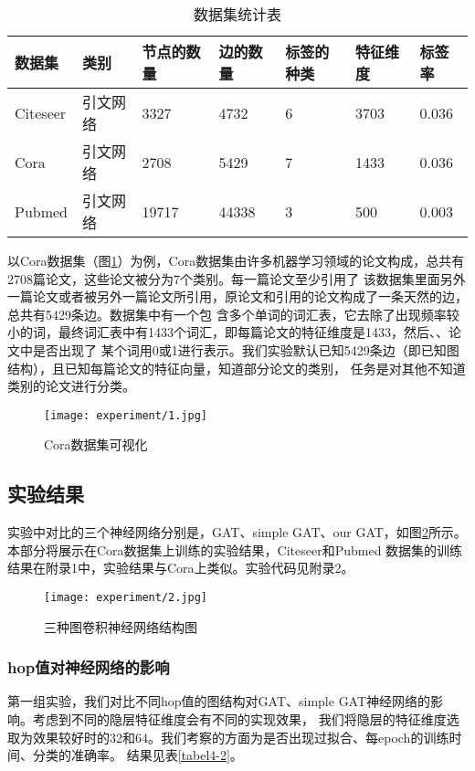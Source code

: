 \begin{table}[]
    \centering
    \caption{数据集统计表}
    \label{tabel4-1}
    \begin{tabular}{lllllll}
    数据集      & 类别   & 节点的数量 & 边的数量  & 标签的种类 & 特征维度 & 标签率   \\ \hline
    Citeseer & 引文网络 & 3327  & 4732  & 6     & 3703 & 0.036 \\
    Cora     & 引文网络 & 2708  & 5429  & 7     & 1433 & 0.036 \\
    Pubmed   & 引文网络 & 19717 & 44338 & 3     & 500  & 0.003
    \end{tabular}
\end{table}

以Cora数据集（图\ref{4-1}）为例，Cora数据集由许多机器学习领域的论文构成，总共有2708篇论文，这些论文被分为7个类别。每一篇论文至少引用了
该数据集里面另外一篇论文或者被另外一篇论文所引用，原论文和引用的论文构成了一条天然的边，总共有5429条边。数据集中有一个包
含多个单词的词汇表，它去除了出现频率较小的词，最终词汇表中有1433个词汇，即每篇论文的特征维度是1433，然后、、论文中是否出现了
某个词用0或1进行表示。我们实验默认已知5429条边（即已知图结构），且已知每篇论文的特征向量，知道部分论文的类别，
任务是对其他不知道类别的论文进行分类。

\begin{figure}[ht]
    \centering
    \texttt{[image: experiment/1.jpg]}
    \caption{\label{4-1}Cora数据集可视化}
\end{figure}

\subsection{实验结果}
实验中对比的三个神经网络分别是，GAT、simple GAT、our GAT，如图\ref{4-2}所示。本部分将展示在Cora数据集上训练的实验结果，Citeseer和Pubmed
数据集的训练结果在附录1中，实验结果与Cora上类似。实验代码见附录2。
\begin{figure}[ht]
    \centering
    \texttt{[image: experiment/2.jpg]}
    \caption{\label{4-2}三种图卷积神经网络结构图}
\end{figure}

\subsubsection{hop值对神经网络的影响}
第一组实验，我们对比不同hop值的图结构对GAT、simple GAT神经网络的影响。考虑到不同的隐层特征维度会有不同的实现效果，
我们将隐层的特征维度选取为效果较好时的32和64。我们考察的方面为是否出现过拟合、每epoch的训练时间、分类的准确率。
结果见表\ref{tabel4-2}。

